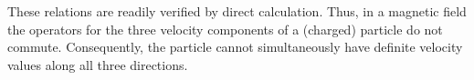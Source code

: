 These relations are readily verified by direct calculation. Thus, in a magnetic field the operators for the three velocity components of a (charged) particle do not commute. Consequently, the particle cannot simultaneously have definite velocity values along all three directions.
